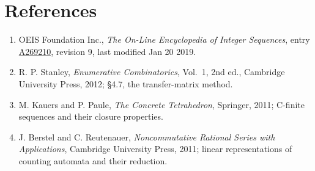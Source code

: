 \documentclass[11pt]{article}
\theoremstyle{definition}
\begin{document}
\section{References}

\begin{enumerate}

\item OEIS Foundation Inc., \emph{The On-Line Encyclopedia of Integer Sequences}, entry \href{https://oeis.org/A269210}{A269210}, revision 9, last modified Jan 20 2019.

\item R. P. Stanley, \emph{Enumerative Combinatorics}, Vol.~1, 2nd ed., Cambridge University Press, 2012; \S4.7, the transfer-matrix method.

\item M. Kauers and P. Paule, \emph{The Concrete Tetrahedron}, Springer, 2011; C-finite sequences and their closure properties.

\item J. Berstel and C. Reutenauer, \emph{Noncommutative Rational Series with Applications}, Cambridge University Press, 2011; linear representations of counting automata and their reduction.

\end{enumerate}
\end{document}
